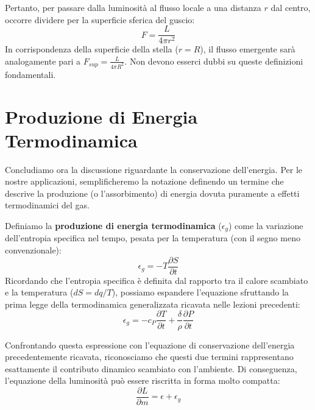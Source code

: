 Pertanto, per passare dalla luminosità al flusso locale a una distanza $r$ dal centro, occorre dividere per la superficie sferica del guscio:
\begin{equation}
F = \frac{L}{4 \pi r^2}
\end{equation}
In corrispondenza della superficie della stella ($r = R$), il flusso emergente sarà analogamente pari a $F_{sup} = \frac{L}{4 \pi R^2}$. Non devono esserci dubbi su queste definizioni fondamentali.

\section{Produzione di Energia Termodinamica}

Concludiamo ora la discussione riguardante la conservazione dell'energia. Per le nostre applicazioni, semplificheremo la notazione definendo un termine che descrive la produzione (o l'assorbimento) di energia dovuta puramente a effetti termodinamici del gas.

Definiamo la \textbf{produzione di energia termodinamica} ($\epsilon_g$) come la variazione dell'entropia specifica nel tempo, pesata per la temperatura (con il segno meno convenzionale):
\begin{equation}
\epsilon_g = - T \frac{\partial S}{\partial t}
\end{equation}
Ricordando che l'entropia specifica è definita dal rapporto tra il calore scambiato e la temperatura ($dS = dq/T$), possiamo espandere l'equazione sfruttando la prima legge della termodinamica generalizzata ricavata nelle lezioni precedenti:
\begin{equation}
\epsilon_g = - c_P \frac{\partial T}{\partial t} + \frac{\delta}{\rho} \frac{\partial P}{\partial t}
\end{equation}

Confrontando questa espressione con l'equazione di conservazione dell'energia precedentemente ricavata, riconosciamo che questi due termini rappresentano esattamente il contributo dinamico scambiato con l'ambiente. Di conseguenza, l'equazione della luminosità può essere riscritta in forma molto compatta:
\begin{equation}
\frac{\partial L}{\partial m} = \epsilon + \epsilon_g
\end{equation}

